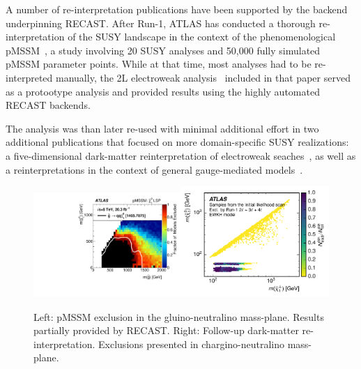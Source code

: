 A number of re-interpretation publications have been supported by the backend underpinning RECAST. After Run-1, ATLAS has conducted a thorough re-interpretation of the SUSY landscape in the context of the phenomenological pMSSM~\cite{Aad:2015baa}, a study involving 20 SUSY analyses and 50,000 fully simulated pMSSM parameter points. While at that time, most analyses had to be re-interpreted manually, the 2L electroweak analysis~\cite{Aad:2014vma} included in that paper served as a protootype analysis and provided results using the highly automated RECAST backends.

The analysis was than later re-used with minimal additional effort in two additional publications that focused on more domain-specific SUSY realizations: a five-dimensional dark-matter reinterpretation of electroweak seaches~\cite{Aaboud:2016wna}, as well as a reinterpretations in the context of general gauge-mediated models~\cite{ATLAS-CONF-2016-033}.

\begin{figure}[h]
\begin{center}
\includegraphics[width=0.5\textwidth,angle=0]{ch5-figures/pMSSM.pdf}\includegraphics[width=0.5\textwidth,angle=0]{ch5-figures/DM.pdf}

\end{center}
\caption{
Left: pMSSM exclusion in the gluino-neutralino mass-plane. Results partially provided by RECAST.
Right: Follow-up dark-matter re-interpretation. Exclusions presented in chargino-neutralino mass-plane.
}
\label{fig:recast-cc}
\end{figure}


